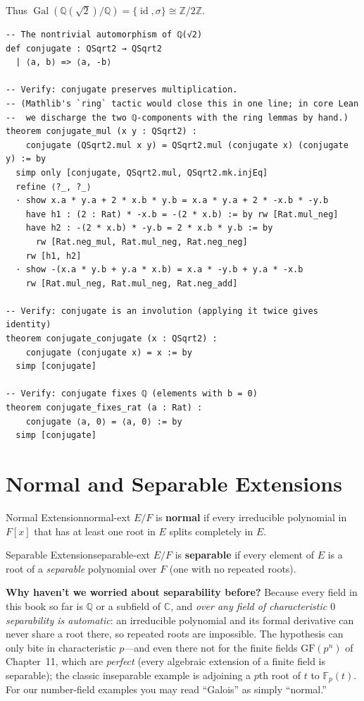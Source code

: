 \documentclass[11pt, a4paper, oneside]{book}
\newcommand{\Z}{\mathbb{Z}}
\newcommand{\Q}{\mathbb{Q}}
\newcommand{\C}{\mathbb{C}}
\newcommand{\F}{\mathbb{F}}
\newcommand{\GF}{\mathrm{GF}}
\newcommand{\Gal}{\operatorname{Gal}}
\newcommand{\id}{\operatorname{id}}
\newcommand{\iso}{\cong}
\begin{document}
Thus $\Gal(\Q(\sqrt{2})/\Q) = \{\id, \sigma\} \iso \Z/2\Z$.

\begin{leanbox}
\begin{verbatim}
-- The nontrivial automorphism of ℚ(√2)
def conjugate : QSqrt2 → QSqrt2
  | ⟨a, b⟩ => ⟨a, -b⟩

-- Verify: conjugate preserves multiplication.
-- (Mathlib's `ring` tactic would close this in one line; in core Lean
--  we discharge the two ℚ-components with the ring lemmas by hand.)
theorem conjugate_mul (x y : QSqrt2) :
    conjugate (QSqrt2.mul x y) = QSqrt2.mul (conjugate x) (conjugate y) := by
  simp only [conjugate, QSqrt2.mul, QSqrt2.mk.injEq]
  refine ⟨?_, ?_⟩
  · show x.a * y.a + 2 * x.b * y.b = x.a * y.a + 2 * -x.b * -y.b
    have h1 : (2 : Rat) * -x.b = -(2 * x.b) := by rw [Rat.mul_neg]
    have h2 : -(2 * x.b) * -y.b = 2 * x.b * y.b := by
      rw [Rat.neg_mul, Rat.mul_neg, Rat.neg_neg]
    rw [h1, h2]
  · show -(x.a * y.b + y.a * x.b) = x.a * -y.b + y.a * -x.b
    rw [Rat.mul_neg, Rat.mul_neg, Rat.neg_add]

-- Verify: conjugate is an involution (applying it twice gives identity)
theorem conjugate_conjugate (x : QSqrt2) :
    conjugate (conjugate x) = x := by
  simp [conjugate]

-- Verify: conjugate fixes ℚ (elements with b = 0)
theorem conjugate_fixes_rat (a : Rat) :
    conjugate ⟨a, 0⟩ = ⟨a, 0⟩ := by
  simp [conjugate]
\end{verbatim}
\end{leanbox}

\section{Normal and Separable Extensions}

\begin{defn}{Normal Extension}{normal-ext}
$E/F$ is \textbf{normal} if every irreducible polynomial in $F[x]$ that has
at least one root in $E$ splits completely in $E$.
\end{defn}

\begin{defn}{Separable Extension}{separable-ext}
$E/F$ is \textbf{separable} if every element of $E$ is a root of a
\emph{separable} polynomial over $F$ (one with no repeated roots).
\end{defn}

\begin{intuition}
\textbf{Why haven't we worried about separability before?} Because every field
in this book so far is $\Q$ or a subfield of $\C$, and \emph{over any field of
characteristic $0$ separability is automatic}: an irreducible polynomial and its
formal derivative can never share a root there, so repeated roots are
impossible. The hypothesis can only bite in characteristic $p$---and even there
not for the finite fields $\GF(p^n)$ of Chapter~11, which are \emph{perfect}
(every algebraic extension of a finite field is separable); the classic
inseparable example is adjoining a $p$th root of $t$ to $\F_p(t)$. For our number-field examples you may
read ``Galois'' as simply ``normal.''
\end{intuition}
\end{document}
